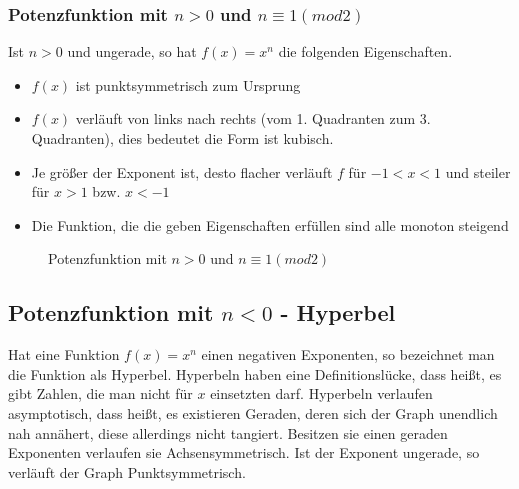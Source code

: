 \subsubsection{Potenzfunktion mit $n>0$ und $ n\equiv1(mod2)$}
Ist $n>0$ und ungerade, so hat $f(x)=x^n$ die folgenden Eigenschaften.
\begin{itemize}
	\item $f(x)$ ist punktsymmetrisch zum Ursprung
	\item $f(x)$ verläuft von links nach rechts (vom 1. Quadranten zum 3. Quadranten), dies bedeutet die Form ist kubisch. %
	\item Je größer der Exponent ist, desto flacher verläuft $f$ für $-1<x<1$ und steiler für $x>1$ bzw. $x<-1$
	\item Die Funktion, die die geben Eigenschaften erfüllen sind alle monoton steigend
\end{itemize}
\begin{figure}[h!]
\centering
{}
\caption{Potenzfunktion mit $n>0$ und $ n\equiv1(mod2)$}
\end{figure}
\subsection{Potenzfunktion mit $n<0$ - Hyperbel}\label{sec:Potenzfunktionen/Potenzfunktionen mit negativem Exponenten}
Hat eine Funktion $f(x)=x^n$ einen negativen Exponenten, so bezeichnet man die Funktion als Hyperbel. Hyperbeln haben eine Definitionslücke, dass heißt, es gibt Zahlen, die man nicht für $x$ einsetzten darf. Hyperbeln verlaufen asymptotisch, dass heißt, es existieren Geraden, deren sich der Graph unendlich nah annähert, diese allerdings nicht tangiert. Besitzen sie einen geraden Exponenten verlaufen sie Achsensymmetrisch. Ist der Exponent ungerade, so verläuft der Graph Punktsymmetrisch. 
